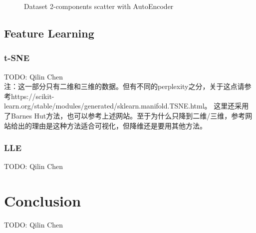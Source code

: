 \documentclass{article}
\begin{document}
\begin{center}
\begin{figure}[htbp]
\centering
{}
\quad
{}
\caption{Dataset 2-components scatter with AutoEncoder}
\label{Fig6}
\end{figure}
\end{center}

\subsection{Feature Learning}
\subsubsection{t-SNE}
TODO: Qilin Chen\\
注：这一部分只有二维和三维的数据。但有不同的perplexity之分，关于这点请参考https://scikit-learn.org/stable/modules/generated/sklearn.manifold.TSNE.html。
这里还采用了Barnes Hut方法，也可以参考上述网站。至于为什么只降到二维/三维，参考网站给出的理由是这种方法适合可视化，但降维还是要用其他方法。
\subsubsection{LLE}
TODO: Qilin Chen\\

\section{Conclusion}
TODO: Qilin Chen\\


\end{document}
